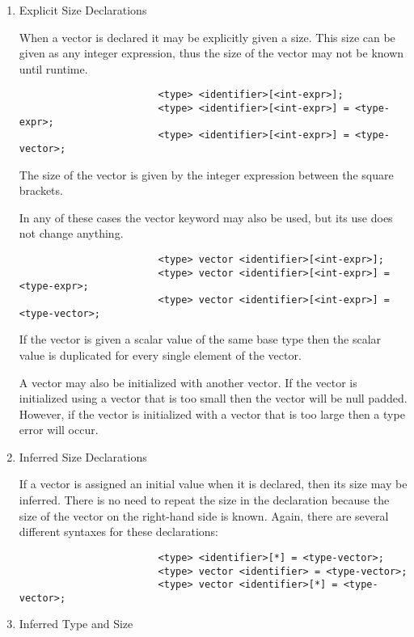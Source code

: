 \documentclass[../../gazprea.tex]{subfiles}
\begin{document}
			\begin{enumerate}
				\item Explicit Size Declarations

					When a vector is declared it may be explicitly given a size. This size can be given as any integer
					expression, thus the size of the vector may not be known until runtime.

					\begin{lstlisting}
						<type> <identifier>[<int-expr>];
						<type> <identifier>[<int-expr>] = <type-expr>;
						<type> <identifier>[<int-expr>] = <type-vector>;
					\end{lstlisting}

					The size of the vector is given by the integer expression between the square brackets.

					In any of these cases the vector keyword may also be used, but its use does not change anything.

					\begin{lstlisting}
						<type> vector <identifier>[<int-expr>];
						<type> vector <identifier>[<int-expr>] = <type-expr>;
						<type> vector <identifier>[<int-expr>] = <type-vector>;
					\end{lstlisting}

					If the vector is given a scalar value of the same base type then the scalar value is duplicated for
					every single element of the vector.

					A vector may also be initialized with another vector. If the vector is initialized using a vector
					that is too small then the vector will be null padded. However, if the vector is initialized with a
					vector that is too large then a type error will occur.

				\item Inferred Size Declarations

					If a vector is assigned an initial value when it is declared, then its size may be inferred. There
					is no need to repeat the size in the declaration because the size of the vector on the right-hand
					side is known. Again, there are several different syntaxes for these declarations:

					\begin{lstlisting}
						<type> <identifier>[*] = <type-vector>;
						<type> vector <identifier> = <type-vector>;
						<type> vector <identifier>[*] = <type-vector>;
					\end{lstlisting}

				\item Inferred Type and Size


\end{enumerate}
\end{document}
